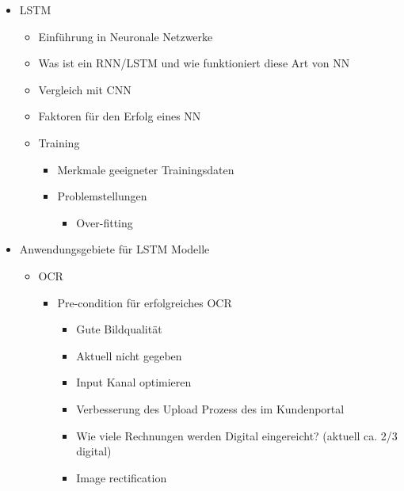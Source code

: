 \documentclass[12pt, twoside]{extarticle}
\begin{document}
\begin{itemize}
    \item LSTM
    \begin{itemize}
        \item Einführung in Neuronale Netzwerke
        \item Was ist ein RNN/LSTM und wie funktioniert diese Art von NN
        \item Vergleich mit CNN
        \item Faktoren für den Erfolg eines NN
        \item Training
        \begin{itemize}
            \item Merkmale geeigneter Trainingsdaten
            \item Problemstellungen
            \begin{itemize}
                \item Over-fitting
            \end{itemize}
        \end{itemize}
        \end{itemize}
		\item Anwendungsgebiete für LSTM Modelle
        \begin{itemize}
	        \item OCR
            \begin{itemize}
			    \item Pre-condition für erfolgreiches OCR
                \begin{itemize}
				    \item Gute Bildqualität
					    \item Aktuell nicht gegeben
						\item Input Kanal optimieren
							\item Verbesserung des Upload Prozess des im Kundenportal
								\item Wie viele Rechnungen werden Digital eingereicht? (aktuell ca. 2/3 digital)
						\item Image rectification

\end{itemize}
\end{itemize}
\end{itemize}
\end{itemize}
\end{document}
